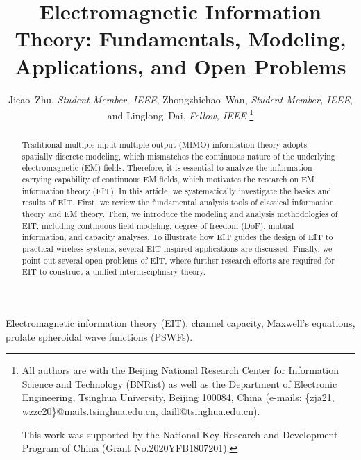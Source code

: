 \documentclass[journal,twocolumn]{IEEEtran}
\begin{document}
\title{Electromagnetic Information Theory: Fundamentals, Modeling, Applications, and Open Problems}

\author{{Jieao~Zhu, {\textit{Student Member, IEEE}}, Zhongzhichao~Wan, {\textit{Student Member, IEEE}}, and Linglong~Dai, {\textit{Fellow, IEEE}}}
\thanks{All authors are with the Beijing National Research Center for Information Science and Technology (BNRist) as well as the Department of Electronic Engineering, Tsinghua University, Beijing 100084, China (e-mails: \{zja21, wzzc20\}@mails.tsinghua.edu.cn, daill@tsinghua.edu.cn).

This work was supported by the National Key Research and Development Program of China (Grant No.2020YFB1807201). }
}

\maketitle

\begin{abstract}
	Traditional multiple-input multiple-output (MIMO) information theory adopts spatially discrete modeling, which mismatches the continuous nature of the underlying electromagnetic (EM) fields. %
 	Therefore, it is essential to analyze the information-carrying capability of continuous EM fields, which motivates the research on EM information theory (EIT). In this article, we systematically investigate the basics and results of EIT. First, we review the fundamental analysis tools of classical information theory and EM theory. Then, we introduce the modeling and analysis methodologies of EIT, including continuous field modeling, degree of freedom (DoF), mutual information, and capacity analyses. To illustrate how EIT guides the design of EIT to practical wireless systems, several EIT-inspired applications are discussed. Finally, we point out several open problems of EIT, where further research efforts are required for EIT to construct a unified interdisciplinary theory.
\end{abstract}

\begin{IEEEkeywords}
    Electromagnetic information theory (EIT), channel capacity, Maxwell's equations, prolate spheroidal wave functions (PSWFs). 
\end{IEEEkeywords}
\end{document}
